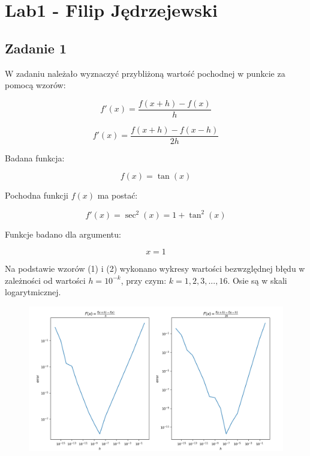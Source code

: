 \documentclass{article}
\begin{document}
	\section*{Lab1 - Filip Jędrzejewski}
	
	\subsection*{Zadanie 1}
	W zadaniu należało wyznaczyć przybliżoną wartość pochodnej w punkcie za pomocą wzorów:
	
	\begin{equation}
	f'(x) = \frac{f(x+h)-f(x)}{h}
	\end{equation}
	
	\begin{equation}
	f'(x) = \frac{f(x+h)-f(x-h)}{2h}
	\end{equation}
	
	Badana funkcja:
	
	\begin{equation}
	f(x) = \tan (x)
	\end{equation}
	
	Pochodna funkcji $f(x)$ ma postać:
	
	\begin{equation}
	f'(x) = \sec ^2 (x) = 1+\tan ^ 2 (x)
	\end{equation}
	
	Funkcje badano dla argumentu:
	
	$$x = 1$$
	
	Na podstawie wzorów (1) i (2) wykonano wykresy wartości bezwzględnej błędu w zależności od wartości $h = 10^{-k}$, przy czym: $k = 1,2,3,...,16$. Osie są w skali logarytmicznej.
	
	\begin{figure}[h]
    		\centering
  		\includegraphics[scale = 0.5]{zad1.png}
	\end{figure}
	
\end{document}
